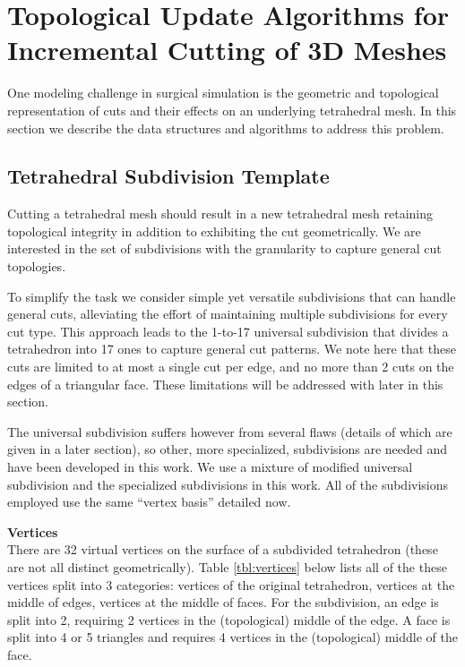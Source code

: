 
\section{Topological Update Algorithms for Incremental Cutting of 3D Meshes}\label{sec:topological_updates}

One modeling challenge in surgical simulation is the geometric and topological representation of cuts and their effects on an underlying tetrahedral mesh. In this section we describe the data structures and algorithms to address this problem.

\subsection{Tetrahedral Subdivision Template}

Cutting a tetrahedral mesh should result in a new tetrahedral mesh retaining topological integrity in addition to exhibiting the cut geometrically. We are interested in the set of subdivisions with the granularity to capture general cut topologies.

To simplify the task we consider simple yet versatile subdivisions that can handle general cuts, alleviating the effort of maintaining multiple subdivisions for every cut type. This approach leads to the 1-to-17 universal subdivision \cite{bielser:gm:2004} that divides a tetrahedron into 17 ones to capture general cut patterns.  We note here that these cuts are limited to at most a single cut per edge, and no more than 2 cuts on the edges of a triangular face. These limitations will be addressed with later in this section.

The universal subdivision suffers however from several flaws (details of which are given in a later section), so other, more specialized, subdivisions are needed and have been developed in this work. We use a mixture of modified universal subdivision and the specialized subdivisions in this work. All of the subdivisions employed use the same \enquote{vertex basis} detailed now.

\textbf{Vertices}\\
There are 32 virtual vertices on the surface of a subdivided tetrahedron (these are not all distinct geometrically). Table \ref{tbl:vertices} below lists all of the these vertices split into 3 categories: vertices of the original tetrahedron, vertices at the middle of edges, vertices at the middle of faces. For the subdivision, an edge is split into 2, requiring 2 vertices in the (topological) middle of the edge. A face is split into 4 or 5 triangles and requires 4 vertices in the (topological) middle of the face.

